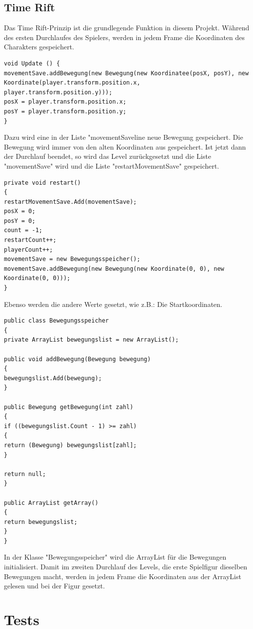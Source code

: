 \section{Time Rift}
Das Time Rift-Prinzip ist die grundlegende Funktion in diesem Projekt. Während des ersten Durchlaufes des Spielers, werden in jedem Frame die Koordinaten des Charakters gespeichert.
\begin{lstlisting}[language={[Sharp]C}, caption=TimeRift-Script]
void Update () {
movementSave.addBewegung(new Bewegung(new Koordinatee(posX, posY), new Koordinate(player.transform.position.x, player.transform.position.y)));
posX = player.transform.position.x;
posY = player.transform.position.y;
}
\end{lstlisting}
Dazu wird eine in der Liste "movementSaveline neue Bewegung gespeichert. Die Bewegung wird immer von den alten Koordinaten aus gespeichert. Ist jetzt dann der Durchlauf beendet, so wird das Level zurückgesetzt und die Liste "movementSave" wird und die Liste "restartMovementSave" gespeichert.
\begin{lstlisting}[language={[Sharp]C}, caption=TimeRift-Restart]
private void restart()
{
restartMovementSave.Add(movementSave);
posX = 0;
posY = 0;
count = -1;
restartCount++;
playerCount++;
movementSave = new Bewegungsspeicher();
movementSave.addBewegung(new Bewegung(new Koordinate(0, 0), new Koordinate(0, 0)));
}
\end{lstlisting}
Ebenso werden die andere Werte gesetzt, wie z.B.: Die Startkoordinaten.
\begin{lstlisting}[language={[Sharp]C}, caption=TimeRift-Bewegungsspeicher]
public class Bewegungsspeicher
{
private ArrayList bewegungslist = new ArrayList();

public void addBewegung(Bewegung bewegung)
{
bewegungslist.Add(bewegung);
}

public Bewegung getBewegung(int zahl)
{
if ((bewegungslist.Count - 1) >= zahl)
{
return (Bewegung) bewegungslist[zahl];
}

return null;
}

public ArrayList getArray()
{
return bewegungslist;
}
}
\end{lstlisting}
In der Klasse "Bewegungsspeicher" wird die ArrayList für die Bewegungen initialisiert.
Damit im zweiten Durchlauf des Levels, die erste Spielfigur dieselben Bewegungen macht, werden in jedem Frame die Koordinaten aus der ArrayList gelesen und bei der Figur gesetzt.


\chapter{Tests}

